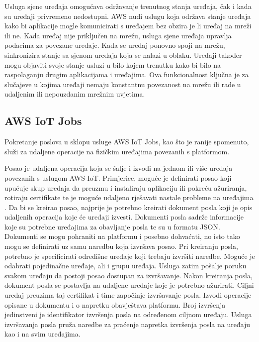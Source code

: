 Usluga sjene uređaja  omogućava održavanje trenutnog stanja uređaja, čak i kada su uređaji privremeno nedostupni. AWS nudi uslugu koja održava stanje uređaja kako bi aplikacije mogle komunicirati s uređajem bez obzira je li uređaj na mreži ili ne. Kada uređaj nije priključen na mrežu, usluga sjene uređaja upravlja podacima za povezane uređaje. Kada se uređaj ponovno spoji na mrežu, sinkronizira stanje sa sjenom uređaja koja se nalazi u oblaku. Uređaji također mogu objaviti svoje stanje usluzi u bilo kojem trenutku kako bi bilo na raspolaganju drugim aplikacijama i uređajima. Ova funkcionalnost ključna je za slučajeve u kojima uređaji nemaju konstantnu povezanost na mrežu ili rade u udaljenim ili nepouzdanim mrežnim uvjetima.

\subsection{AWS IoT Jobs}

Pokretanje poslova u sklopu usluge AWS IoT Jobs, kao što je ranije spomenuto, služi za udaljene operacije na fizičkim uređajima povezanih s platformom. 

Posao je udaljena operacija koja se šalje i izvodi na jednom ili više uređaja povezanih s uslugom AWS IoT. Primjerice, moguće je definirati posao koji upućuje skup uređaja da preuzmu i instaliraju aplikaciju ili pokreću ažuriranja, rotiraju certifikate te je moguće udaljeno rješavati nastale probleme na uređajima . Da bi se kreirao posao, najprije je potrebno kreirati dokument posla  koji je opis udaljenih operacija koje će uređaji izvesti. Dokumenti posla sadrže informacije koje su potrebne uređajima za obavljanje posla te su u formatu JSON. Dokumenti se mogu pohraniti na platformu i posebno dohvaćati, no isto tako mogu se definirati uz samu naredbu koja izvršava posao. Pri kreiranju posla, potrebno je specificirati odredišne uređaje  koji trebaju izvršiti naredbe. Moguće je odabrati pojedinačne uređaje, ali i grupu uređaja. Usluga zatim pošalje poruku svakom uređaju da postoji posao dostupan za izvršavanje. Nakon kreiranja posla, dokument posla se postavlja na udaljene uređaje koje je potrebno ažurirati. Ciljni uređaj preuzima taj certifikat i time započinje izvršavanje posla. Izvodi operacije opisane u dokumentu i o napretku obavještava platformu. Broj izvršenja  jedinstveni je identifikator izvršenja posla na određenom ciljnom uređaju. Usluga izvršavanja posla pruža naredbe za praćenje napretka izvršenja posla na uređaju kao i na svim uređajima. 

